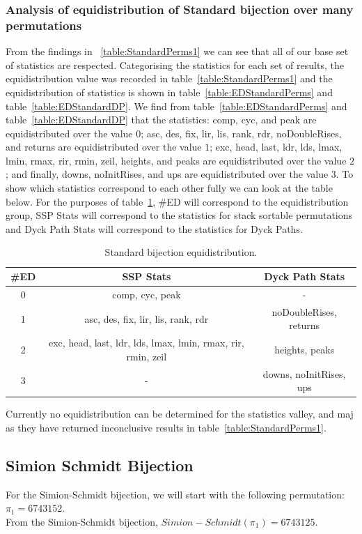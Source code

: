 \documentclass[12pt]{article}
\begin{document}
\subsubsection{Analysis of equidistribution of Standard bijection over many permutations}
From the findings in ~\ref{table:StandardPerms1} we can see that all of our base set of statistics are respected. Categorising the statistics for each set of results, the equidistribution value was recorded in table~\ref{table:StandardPerms1} and the equidistribution of statistics is shown in table~\ref{table:EDStandardPerms} and table~\ref{table:EDStandardDP}. We find from table~\ref{table:EDStandardPerms} and table~\ref{table:EDStandardDP} that the statistics: comp, cyc, and peak are equidistributed over the value $0$; asc, des, fix, lir, lis, rank, rdr, noDoubleRises, and returns are equidistributed over the value $1$; exc, head, last, ldr, lds, lmax, lmin, rmax, rir, rmin, zeil, heights, and peaks are equidistributed over the value $2$; and finally, downs, noInitRises, and ups are equidistributed over the value $3$. To show which statistics correspond to each other fully we can look at the table below. For the purposes of table~\ref{table:FinalEDStandard}, \#ED will correspond to the equidistribution group, SSP Stats will correspond to the statistics for stack sortable permutations and Dyck Path Stats will correspond to the statistics for Dyck Paths.
\begin{table}[H]
\caption{Standard bijection equidistribution.}
\begin{tabular}{c | c | c}
\hline\hline
\#ED & SSP Stats & Dyck Path Stats\\ [0.5ex]
\hline
0 & comp, cyc, peak & - \\
\hline
1 & asc, des, fix, lir, lis, rank, rdr & noDoubleRises, returns \\
\hline
2 & exc, head, last, ldr, lds, lmax, lmin, rmax, rir, rmin, zeil & heights, peaks \\
\hline
3 & - & downs, noInitRises, ups\\
\hline
\end{tabular}
\label{table:FinalEDStandard}
\end{table}
Currently no equidistribution can be determined for the statistics valley, and maj as they have returned inconclusive results in table~\ref{table:StandardPerms1}.

\subsection{Simion Schmidt Bijection}
For the Simion-Schmidt bijection, we will start with the following permutation: $\pi_1 = 6743152$.\\
From the Simion-Schmidt bijection, $Simion-Schmidt(\pi_1) = 6743125$.\\
\end{document}
